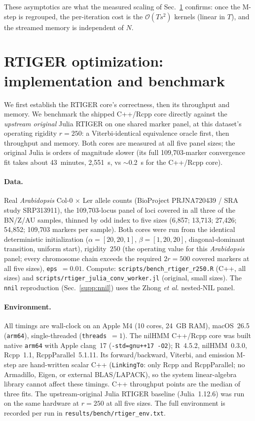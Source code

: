 \documentclass[11pt]{article}
\newcommand{\code}[1]{\texttt{#1}}
\newcommand{\bigO}{\mathcal{O}}
\providecommand{\nnil}{\texttt{nnil}\xspace}
\begin{document}
These asymptotics are what the measured scaling of Sec.~\ref{supp:optimization}
confirms: once the M-step is regrouped, the per-iteration cost is the $\bigO(T s^2)$
kernels (linear in $T$), and the streamed memory is independent of $N$.

\section{RTIGER optimization: implementation and benchmark}
\label{supp:optimization}

We first establish the RTIGER core's correctness, then its throughput and memory.
We benchmark the shipped C++/Rcpp core directly against the \emph{upstream
original} Julia RTIGER \citep{rtiger_2023} on one shared marker panel, at this
dataset's operating rigidity $r=250$: a Viterbi-identical equivalence oracle first,
then throughput and memory. Both cores are measured at all five panel sizes; the
original Julia is orders of magnitude slower (its full 109{,}703-marker convergence
fit takes about 43~minutes, 2{,}551~s, vs $\sim$0.2~s for the C++/Rcpp core).

\paragraph{Data.} Real \emph{Arabidopsis} Col-0 $\times$ Ler allele counts
(BioProject PRJNA720439 / SRA study SRP313911), the 109{,}703-locus panel of loci
covered in all three of the BN/Z/AU samples, thinned by odd index to five sizes
(6{,}857; 13{,}713; 27{,}426; 54{,}852; 109{,}703 markers per sample). Both cores
were run from the identical deterministic initialization ($\alpha=[20,20,1]$,
$\beta=[1,20,20]$, diagonal-dominant transition, uniform start), rigidity~$250$ (the
operating value for this \emph{Arabidopsis} panel; every chromosome chain exceeds
the required $2r=500$ covered markers at all five sizes), \code{eps}~$=0.01$.
Compute: \code{scripts/bench\_rtiger\_r250.R} (C++, all sizes) and
\code{scripts/rtiger\_julia\_conv\_worker.jl} (original, small sizes). The
\nnil reproduction (Sec.~\ref{supp:nnil}) uses the Zhong \emph{et al.} nested-NIL
panel.

\paragraph{Environment.} All timings are wall-clock on an Apple M4 (10 cores,
24~GB RAM), macOS~26.5 (\code{arm64}), single-threaded (\code{threads}~$=1$). The
nilHMM C++/Rcpp core was built native \code{arm64} with Apple clang~17
(\code{-std=gnu++17 -O2}); R~4.5.2, nilHMM~0.3.0, Rcpp~1.1, RcppParallel~5.1.11.
Its forward/backward, Viterbi, and emission M-step are hand-written scalar C++
(\code{LinkingTo}: only Rcpp and RcppParallel; no Armadillo, Eigen, or external
BLAS/LAPACK), so the system linear-algebra library cannot affect these timings.
C++ throughput points are the median of three fits. The upstream-original Julia
RTIGER baseline (Julia~1.12.6) was run on the same hardware at $r=250$ at all five
sizes. The full environment is recorded per run in
\code{results/bench/rtiger\_env.txt}.
\end{document}
